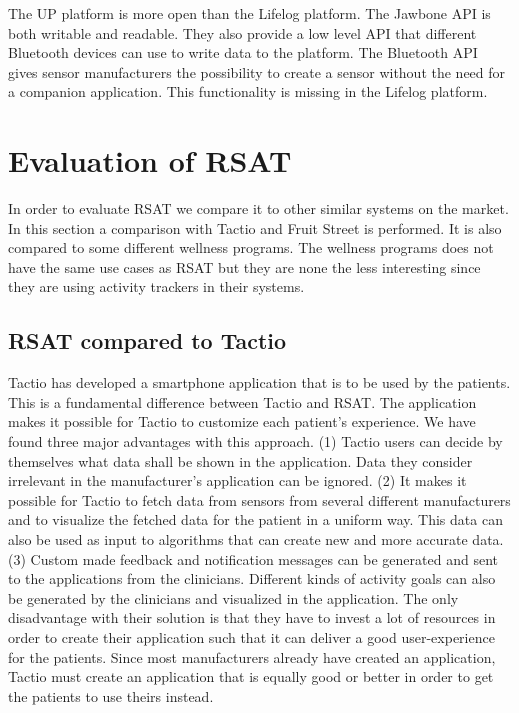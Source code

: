 \documentclass{cslthse-msc}
\begin{document}
The UP platform is more open than the Lifelog platform. The Jawbone API is both writable and readable. They also provide a low level API that different Bluetooth devices can use to write data to the platform. The Bluetooth API gives sensor manufacturers the possibility to create a sensor without the need for a companion application. This functionality is missing in the Lifelog platform.   


\section{Evaluation of RSAT}

In order to evaluate RSAT we compare it to other similar systems on the market. In this section a comparison with Tactio and Fruit Street is performed. It is also compared to some different wellness programs. The wellness programs does not have the same use cases as RSAT but they are none the less interesting since they are using activity trackers in their systems.

\subsection{RSAT compared to Tactio}

Tactio has developed a smartphone application that is to be used by the patients. This is a fundamental difference between Tactio and RSAT. The application makes it possible for Tactio to customize each patient’s experience. We have found three major advantages with this approach. (1) Tactio users can decide by themselves what data 
shall be shown in the application. Data they consider irrelevant in the manufacturer’s application can be ignored. (2) It makes it possible for Tactio to fetch data from sensors from several different manufacturers and to visualize the fetched data for the patient in a uniform way. This data can also be used as input to algorithms that can create new and more accurate data. (3) Custom made feedback and notification messages can be generated and sent to the applications from the clinicians. Different kinds of activity goals can also be generated by the clinicians and visualized in the application. The only disadvantage with their solution is that they have to invest a lot of resources in order to create their application such that it can deliver a good user-experience for the patients. Since most manufacturers already have created an application, Tactio must create an application that is equally good or better in order to get the patients to use theirs instead. 
\end{document}
